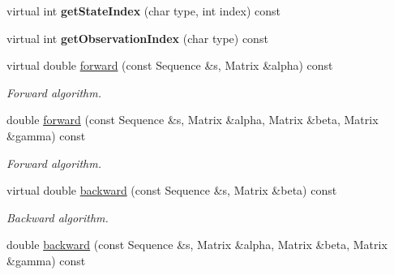 \begin{DoxyCompactItemize}
\item 
\mbox{\label{classtops_1_1ProfileHiddenMarkovModel_a01f36825fbefa884ddd408a5abff9329}} 
virtual int {\bfseries get\+State\+Index} (char type, int index) const
\item 
\mbox{\label{classtops_1_1ProfileHiddenMarkovModel_a585ff417f4b4cb038b01fe1bf2144337}} 
virtual int {\bfseries get\+Observation\+Index} (char type) const
\item 
\mbox{\label{classtops_1_1ProfileHiddenMarkovModel_a5bed95bd1c353981d0f655bb34bce529}} 
virtual double \hyperlink{classtops_1_1ProfileHiddenMarkovModel_a5bed95bd1c353981d0f655bb34bce529}{forward} (const Sequence \&s, Matrix \&alpha) const
\begin{DoxyCompactList}\small\item\em Forward algorithm. \end{DoxyCompactList}\item 
\mbox{\label{classtops_1_1ProfileHiddenMarkovModel_af94494083fa15c2f56d100cc5dc1f4ff}} 
double \hyperlink{classtops_1_1ProfileHiddenMarkovModel_af94494083fa15c2f56d100cc5dc1f4ff}{forward} (const Sequence \&s, Matrix \&alpha, Matrix \&beta, Matrix \&gamma) const
\begin{DoxyCompactList}\small\item\em Forward algorithm. \end{DoxyCompactList}\item 
\mbox{\label{classtops_1_1ProfileHiddenMarkovModel_a45e3683d02e70924ee909fc0274b0ad7}} 
virtual double \hyperlink{classtops_1_1ProfileHiddenMarkovModel_a45e3683d02e70924ee909fc0274b0ad7}{backward} (const Sequence \&s, Matrix \&beta) const
\begin{DoxyCompactList}\small\item\em Backward algorithm. \end{DoxyCompactList}\item 
\mbox{\label{classtops_1_1ProfileHiddenMarkovModel_a6fcd4bd99bfc089588744e0e3efc9fcd}} 
double \hyperlink{classtops_1_1ProfileHiddenMarkovModel_a6fcd4bd99bfc089588744e0e3efc9fcd}{backward} (const Sequence \&s, Matrix \&alpha, Matrix \&beta, Matrix \&gamma) const

\end{DoxyCompactItemize}
